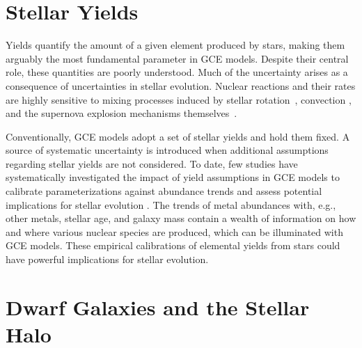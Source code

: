 \documentclass[main.tex]{subfiles}
\begin{document}
\begin{doublespace}
\section{Stellar Yields}
\label{main:sec:intro:yields}

Yields quantify the amount of a given element produced by stars, making them
arguably the most fundamental parameter in GCE models.
Despite their central role, these quantities are poorly understood.
Much of the uncertainty arises as a consequence of uncertainties in stellar
evolution.
Nuclear reactions and their rates are highly sensitive to mixing processes
induced by stellar rotation~\citep[e.g.,][]{Frischknecht2016}, convection
\citep[e.g.,][]{Chieffi2001}, and the supernova explosion mechanisms
themselves~\citep[e.g.,][]{Griffith2021b}.
\par
Conventionally, GCE models adopt a set of stellar yields and hold them fixed.
A source of systematic uncertainty is introduced when additional assumptions
regarding stellar yields are not considered.
To date, few studies have systematically investigated the impact of yield
assumptions in GCE models to calibrate parameterizations against abundance
trends and assess potential implications for stellar evolution
\citep[e.g.,][]{delosReyes2022, Womack2023}.
The trends of metal abundances with, e.g., other metals, stellar age, and
galaxy mass contain a wealth of information on how and where various nuclear
species are produced, which can be illuminated with GCE models.
These empirical calibrations of elemental yields from stars could have
powerful implications for stellar evolution.

\section{Dwarf Galaxies and the Stellar Halo}
\label{main:sec:intro:dwarfs}


\end{doublespace}
\end{document}
